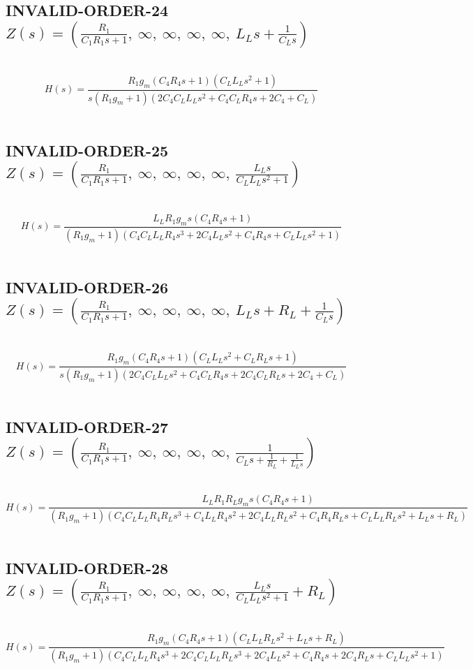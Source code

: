 \documentclass{article}
\begin{document}
\subsection{INVALID-ORDER-24 $Z(s) = \left( \frac{R_{1}}{C_{1} R_{1} s + 1}, \  \infty, \  \infty, \  \infty, \  \infty, \  L_{L} s + \frac{1}{C_{L} s}\right)$ } \ 
\textbf{\[H(s) = \frac{R_{1} g_{m} \left(C_{4} R_{4} s + 1\right) \left(C_{L} L_{L} s^{2} + 1\right)}{s \left(R_{1} g_{m} + 1\right) \left(2 C_{4} C_{L} L_{L} s^{2} + C_{4} C_{L} R_{4} s + 2 C_{4} + C_{L}\right)}\] } \ 
\subsection{INVALID-ORDER-25 $Z(s) = \left( \frac{R_{1}}{C_{1} R_{1} s + 1}, \  \infty, \  \infty, \  \infty, \  \infty, \  \frac{L_{L} s}{C_{L} L_{L} s^{2} + 1}\right)$ } \ 
\textbf{\[H(s) = \frac{L_{L} R_{1} g_{m} s \left(C_{4} R_{4} s + 1\right)}{\left(R_{1} g_{m} + 1\right) \left(C_{4} C_{L} L_{L} R_{4} s^{3} + 2 C_{4} L_{L} s^{2} + C_{4} R_{4} s + C_{L} L_{L} s^{2} + 1\right)}\] } \ 
\subsection{INVALID-ORDER-26 $Z(s) = \left( \frac{R_{1}}{C_{1} R_{1} s + 1}, \  \infty, \  \infty, \  \infty, \  \infty, \  L_{L} s + R_{L} + \frac{1}{C_{L} s}\right)$ } \ 
\textbf{\[H(s) = \frac{R_{1} g_{m} \left(C_{4} R_{4} s + 1\right) \left(C_{L} L_{L} s^{2} + C_{L} R_{L} s + 1\right)}{s \left(R_{1} g_{m} + 1\right) \left(2 C_{4} C_{L} L_{L} s^{2} + C_{4} C_{L} R_{4} s + 2 C_{4} C_{L} R_{L} s + 2 C_{4} + C_{L}\right)}\] } \ 
\subsection{INVALID-ORDER-27 $Z(s) = \left( \frac{R_{1}}{C_{1} R_{1} s + 1}, \  \infty, \  \infty, \  \infty, \  \infty, \  \frac{1}{C_{L} s + \frac{1}{R_{L}} + \frac{1}{L_{L} s}}\right)$ } \ 
\textbf{\[H(s) = \frac{L_{L} R_{1} R_{L} g_{m} s \left(C_{4} R_{4} s + 1\right)}{\left(R_{1} g_{m} + 1\right) \left(C_{4} C_{L} L_{L} R_{4} R_{L} s^{3} + C_{4} L_{L} R_{4} s^{2} + 2 C_{4} L_{L} R_{L} s^{2} + C_{4} R_{4} R_{L} s + C_{L} L_{L} R_{L} s^{2} + L_{L} s + R_{L}\right)}\] } \ 
\subsection{INVALID-ORDER-28 $Z(s) = \left( \frac{R_{1}}{C_{1} R_{1} s + 1}, \  \infty, \  \infty, \  \infty, \  \infty, \  \frac{L_{L} s}{C_{L} L_{L} s^{2} + 1} + R_{L}\right)$ } \ 
\textbf{\[H(s) = \frac{R_{1} g_{m} \left(C_{4} R_{4} s + 1\right) \left(C_{L} L_{L} R_{L} s^{2} + L_{L} s + R_{L}\right)}{\left(R_{1} g_{m} + 1\right) \left(C_{4} C_{L} L_{L} R_{4} s^{3} + 2 C_{4} C_{L} L_{L} R_{L} s^{3} + 2 C_{4} L_{L} s^{2} + C_{4} R_{4} s + 2 C_{4} R_{L} s + C_{L} L_{L} s^{2} + 1\right)}\] } \ 
\end{document}
